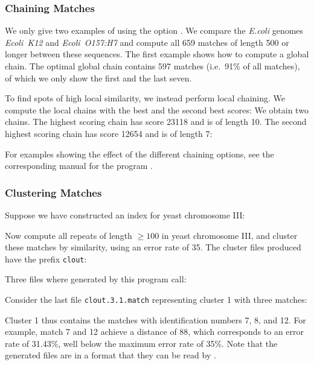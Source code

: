 \documentclass[12pt,titlepage]{article}
\newcommand{\EcoliKtwelve}[0]{\emph{Ecoli~K12}\index{Ecoli~K12}\xspace}
\newcommand{\EcoliH}[0]{\emph{Ecoli~O157:H7}\index{Ecoli~O157:H7}\xspace}
\newcommand{\EXECUTE}[1]{}
\begin{document}
\begin{AboutVmatch}
\subsubsection{Chaining Matches}
We only give two examples of using the option .
We compare the \emph{E.coli} genomes \EcoliKtwelve and \EcoliH
and compute all 659 matches of length 500 or longer between these 
sequences. The first example shows how to compute a global chain.
The optimal global chain contains 597 matches (i.e.\ 91\% of all matches), of
which we only show the first and the last seven.

\EXECUTE{vmatch -l 500 -q EcoliK12 -pp chain global EcoliO157H7 | multipart.pl 0 7 591 597}

To find spots of high local similarity, we instead perform local chaining.
We compute the local chains with the best and the second best scores:
We obtain two chains. The highest scoring chain has score 23118 and
is of length 10. The second highest scoring chain has score 12654 and is
of length 7:

\EXECUTE{vmatch -l 500 -q EcoliK12 -pp chain local 2b EcoliO157H7}

For examples showing the effect of the different chaining
options, see the corresponding manual for the program \CH.

\subsubsection{Clustering Matches}
Suppose we have constructed an index for yeast chromosome III:

\EXECUTE{mkvtree -dna -db ychrIII.fna -v -tis -ois -bwt -suf -lcp}

Now compute all repeats of length \(\geq 100\) in yeast chromosome III,
and cluster these matches by similarity, using an 
error rate of 35. The cluster files produced have 
the prefix \texttt{clout}:

\EXECUTE{vmatch -l 100 -pp matchcluster erate 35 outprefix clout ychrIII.fna}

Three files where generated by this program call:

\EXECUTE{ls -l clout.*}

Consider the last file \texttt{clout.3.1.match} representing cluster 1
with three matches:

\EXECUTE{cat clout.3.1.match}

Cluster 1 thus contains the matches with identification
numbers 7, 8, and 12. For example, match 7 and 12 achieve a distance of 
88, which corresponds to an error rate of 31.43\%, well below the maximum error 
rate of 35\%. Note that
the generated files are in a format that they can be read by \VMS.


\end{AboutVmatch}
\end{document}
